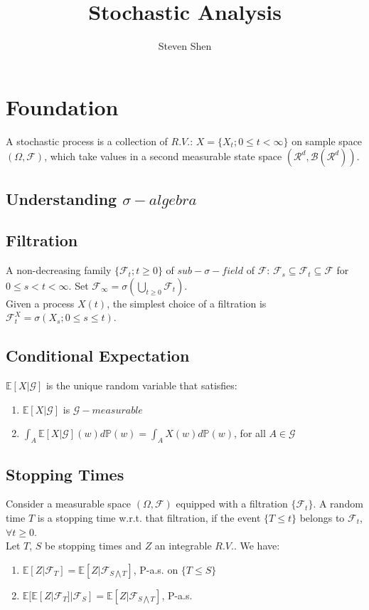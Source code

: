 \documentclass[a4paper, 12pt]{article}
\title{\textbf{Stochastic Analysis}}
\author{Steven Shen}
\begin{document}
\maketitle

\section{Foundation}
A stochastic process is a collection of $R.V.$: $X = \{X_t; 0 \leq t < \infty\}$ on sample space $(\Omega, \mathcal{F})$, which take values in a second measurable state space $(\mathcal{R}^d, \mathcal{B}(\mathcal{R}^d))$.

\subsection{Understanding $\sigma-algebra$}

\subsection{Filtration}
A non-decreasing family $\{ \mathcal{F}_t; t \geq 0 \}$ of $sub-\sigma-field$ of $\mathcal{F}$: $\mathcal{F}_s \subseteq \mathcal{F}_t \subseteq \mathcal{F}$ for $0 \leq s < t < \infty$. Set $\mathcal{F}_{\infty} = \sigma(\bigcup_{t \geq 0}\mathcal{F}_t)$.\\
\indent Given a process $X(t)$, the simplest choice of a filtration is $\mathcal{F}_t ^X = \sigma(X_s; 0 \leq s \leq t)$.

\subsection{Conditional Expectation}
$\mathbb{E}[X|\mathcal{G}]$ is the unique random variable that satisfies:
\begin{enumerate}
	\item $\mathbb{E}[X|\mathcal{G}]$ is $\mathcal{G}-measurable$
	\item $\int_A \mathbb{E}[X|\mathcal{G}](w) d\mathbb{P}(w) = \int_A X(w) d\mathbb{P}(w)$, for all $A \in \mathcal{G}$
\end{enumerate}

\subsection{Stopping Times}
Consider a measurable space $(\Omega, \mathcal{F})$ equipped with a filtration $\{ \mathcal{F}_t \}$. A random time $T$ is a stopping time w.r.t. that filtration, if the event $\{ T \leq t \}$ belongs to $\mathcal{F}_t$, $\forall t \geq 0$. \\
\indent Let $T$, $S$ be stopping times and $Z$ an integrable $R.V.$. We have:
\begin{enumerate}
	\item $\mathbb{E}[Z|{\mathcal{F}_T}] = \mathbb{E}[Z|{\mathcal{F}_{S \bigwedge T}}]$, P-a.s. on $\{ T \leq S \}$
	\item $\mathbb{E}[\mathbb{E}[Z|{\mathcal{F}_T}]|\mathcal{F}_S] = \mathbb{E}[Z|{\mathcal{F}_{S \bigwedge T}}]$, P-a.s.
\end{enumerate}
\end{document}
